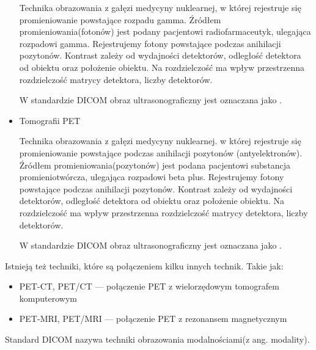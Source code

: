 \begin{itemize}
          Technika obrazowania  z gałęzi medycyny nuklearnej, w której rejestruje się promieniowanie powstające rozpadu gamma.
          Źródłem promieniowania(fotonów) jest podany pacjentowi radiofarmaceutyk, ulegająca rozpadowi gamma.
          Rejestrujemy fotony powstające podczas anihilacji pozytonów.
          Kontrast zależy od wydajności detektorów, odległość detektora od obiektu oraz położenie obiektu.
          Na rozdzielczość ma wpływ przestrzenna rozdzielczość matrycy detektora, liczby detektorów.

          W standardzie DICOM obraz ultrasonograficzny jest oznaczana jako .

    \item Tomografii PET

          Technika obrazowania  z gałęzi medycyny nuklearnej. w której rejestruje się promieniowanie powstające podczas anihilacji pozytonów (antyelektronów).
          Źródłem promieniowania(pozytonów) jest podana pacjentowi substancja promieniotwórcza, ulegająca rozpadowi beta plus.
          Rejestrujemy fotony powstające podczas anihilacji pozytonów.
          Kontrast zależy od wydajności detektorów, odległość detektora od obiektu oraz położenie obiektu.
          Na rozdzielczość ma wpływ przestrzenna rozdzielczość matrycy detektora, liczby detektorów.

          W standardzie DICOM obraz ultrasonograficzny jest oznaczana jako .

\end{itemize}

Istnieją też techniki, które są połączeniem kilku innych technik.
Takie jak:
\begin{itemize}
    \item PET-CT, PET/CT --- połączenie PET z wielorzędowym tomografem komputerowym
    \item PET-MRI, PET/MRI --- połączenie PET z rezonansem magnetycznym
\end{itemize}

Standard DICOM nazywa techniki obrazowania modalnościami(z ang. modality).
